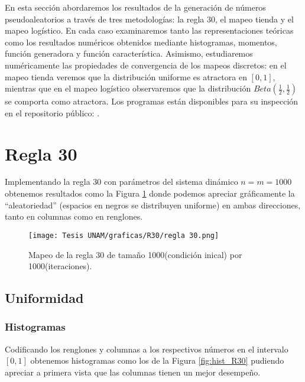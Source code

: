 \documentclass[../Main.tex]{subfiles}
\begin{document}
En esta sección abordaremos los resultados de la generación de números pseudoaleatorios a través de tres metodologías: la regla 30, el mapeo tienda y el mapeo logístico. En cada caso examinaremos tanto las representaciones teóricas como los resultados numéricos obtenidos mediante histogramas, momentos, función generadora y función característica. Asimismo, estudiaremos numéricamente las propiedades de convergencia de los mapeos discretos: en el mapeo tienda veremos que la distribución uniforme es atractora en $[0,1]$, mientras que en el mapeo logístico observaremos que la distribución $Beta(\tfrac{1}{2},\tfrac{1}{2})$ se comporta como atractora. Los programas están disponibles para su inspección en el repositorio público: \cite{Lince2024}.
\section{Regla 30}
Implementando la regla 30 con parámetros del sistema dinámico $n=m=1000$ 
obtenemos resultados como la Figura \ref{fig:R30} donde podemos apreciar gráficamente la ``aleatoriedad'' (espacios en negros se distribuyen uniforme) en ambas direcciones, tanto en columnas como en renglones.
\begin{figure}[h!]
    \centering
    \texttt{[image: Tesis UNAM/graficas/R30/regla 30.png]}
    \caption{Mapeo de la regla 30 de tamaño 1000(condición inical) por 1000(iteraciones).}
    \label{fig:R30}
\end{figure} 
\subsection{Uniformidad}
\subsubsection{Histogramas}
Codificando los renglones y columnas a los respectivos números en el intervalo $[0,1]$ obtenemos histogramas como los de la Figura \ref{fig:hist_R30} pudiendo apreciar a primera vista que las columnas tienen un mejor desempeño. 
\end{document}
